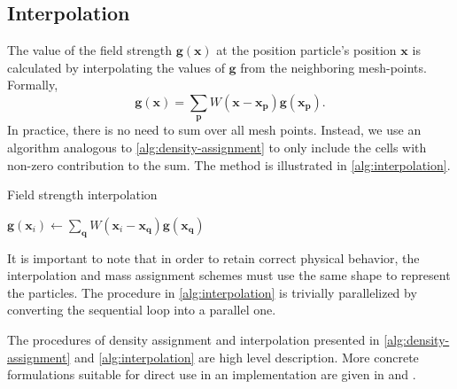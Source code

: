 \subsection{Interpolation}
The value of the field strength $\mathbf{g}(\mathbf{x})$ at the position particle's position $\mathbf{x}$ is calculated by interpolating the values of $\mathbf{g}$ from the neighboring mesh-points.
Formally,
\begin{equation*}
    \mathbf{g}(\mathbf{x}) = \sum_\mathbf{p} W(\mathbf{x} - \mathbf{x}_\mathbf{p}) \mathbf{g}(\mathbf{x}_\mathbf{p}).
\end{equation*}
In practice, there is no need to sum over all mesh points.
Instead, we use an algorithm analogous to \autoref{alg:density-assignment} to only include the cells with non-zero contribution to the sum.
The method is illustrated in \autoref{alg:interpolation}.
\begin{algorithm}
    \caption{Field strength interpolation}\label{alg:interpolation}
    \begin{algorithmic}[1]
        \State $\mathbf{g}(\mathbf{x}_i) \gets \sum_\mathbf{q} W(\mathbf{x}_i - \mathbf{x}_\mathbf{q}) \mathbf{g}(\mathbf{x}_\mathbf{q})$
        \EndFor
        \EndFor
    \end{algorithmic}
\end{algorithm}
It is important to note that in order to retain correct physical behavior, the interpolation and mass assignment schemes must use the same shape to represent the particles.
The procedure in \autoref{alg:interpolation} is trivially parallelized by converting the sequential loop into a parallel one.

The procedures of density assignment and interpolation presented in \autoref{alg:density-assignment} and \autoref{alg:interpolation} are high level description.
More concrete formulations suitable for direct use in an implementation are given in \cite{Hockney1988} and \cite{Kravtsov2002PM}.

